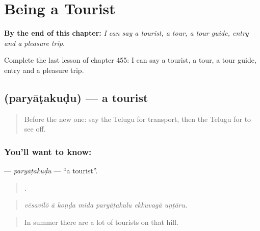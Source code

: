 
\chapter{Being a Tourist}
\label{ch:te-being-a-tourist}

\begin{chapteropening}
\textbf{By the end of this chapter:} \emph{I can say a tourist, a tour, a tour guide, entry and a pleasure trip.}

Complete the last lesson of chapter 455: I can say a tourist, a tour, a tour guide, entry and a pleasure trip.
\end{chapteropening}

\section[\texorpdfstring{\te{పర్యాటకుడు} (paryāṭakuḍu)}{పర్యాటకుడు (paryāṭakuḍu)}]{ (paryāṭakuḍu) — a tourist}

\label{lesson:TE-C455-paryatakudu}



\begin{quote}
Before the new one: say the Telugu for transport, then the Telugu for to see off.
\end{quote}

\subsection*{You'll want to know: }
\textbf{} — \emph{paryāṭakuḍu} — \textquotedblleft{}a tourist\textquotedblright{}.

\begin{quote}
      .
\end{quote}

\begin{quote}
\emph{vēsavilō ā koṇḍa mīda paryāṭakulu ekkuvagā uṇṭāru.}
\end{quote}

\begin{quote}
In summer there are a lot of tourists on that hill.
\end{quote}

